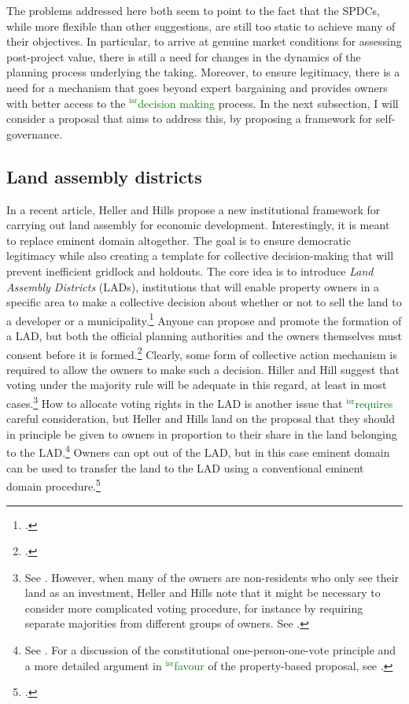 \documentclass[12pt,a4paper]{book} %
\newcommand{\isr}[1]{\textcolor{green}{$^{\textrm{isr}}${#1}}}
\begin{document}
The problems addressed here both seem to point to the fact that the SPDCs, while more flexible than other suggestions, are still too static to achieve many of their objectives. In particular, to arrive at genuine market conditions for assessing post-project value, there is still a need for changes in the dynamics of the planning process underlying the taking. Moreover, to ensure legitimacy, there is a need for a mechanism that goes beyond expert bargaining and provides owners with better access to the \isr{decision making} process. In the next subsection, I will consider a proposal that aims to address this, by proposing a framework for self-governance. 

\subsection{Land assembly districts}

In a recent article, Heller and Hills propose a new institutional framework for carrying out land assembly for economic development. Interestingly, it is meant to replace eminent domain altogether. The goal is to ensure democratic legitimacy while also creating a template for collective decision-making that will prevent inefficient gridlock and holdouts. The core idea is to introduce {\it Land Assembly Districts} (LADs), institutions that will enable property owners in a specific area to make a collective decision about whether or not to sell the land to a developer or a municipality.\footcite[1469-1470]{heller08} Anyone can propose and promote the formation of a LAD, but both the official planning authorities and the owners themselves must consent before it is formed.\footcite[1488-1489]{heller08} Clearly, some form of collective action mechanism is required to allow the owners to make such a decision. Hiller and Hill suggest that voting under the majority rule will be adequate in this regard, at least in most cases.\footnote{See \cite[1496]{heller08}. However, when many of the owners are non-residents who only see their land as an investment, Heller and Hills note that it might be necessary to consider more complicated voting procedure, for instance by requiring separate majorities from different groups of owners. See \cite[1523-1524]{heller08}.} How to allocate voting rights in the LAD is another issue that \isr{requires} careful consideration, but Heller and Hills land on the proposal that they should in principle be given to owners in proportion to their share in the land belonging to the LAD.\footnote{See \cite[1492]{heller08}. For a discussion of the constitutional one-person-one-vote principle and a more detailed argument in \isr{favour} of the property-based proposal, see \cite[1503-1507]{heller08}.} Owners can opt out of the LAD, but in this case eminent domain can be used to transfer the land to the LAD using a conventional eminent domain procedure.\footcite[1496]{heller08}
\end{document}
